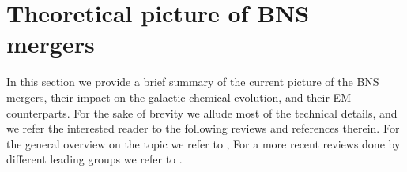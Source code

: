 %
%
%
%



\section{Theoretical picture of \ac{BNS} mergers}

In this section we provide a brief summary of the current picture of the 
\ac{BNS} mergers, their impact on the galactic chemical evolution, and their 
\ac{EM} counterparts. For the sake of brevity we allude most of the technical details, 
and we refer the interested reader to the following reviews and references therein.
%
For the general overview on the topic we refer to \citet{Shibata:2016},
For a more recent reviews done by different leading groups we refer to 
\citet{Radice:2020ddv,Bernuzzi:2020tgt,Shibata:2019wef}.
%





